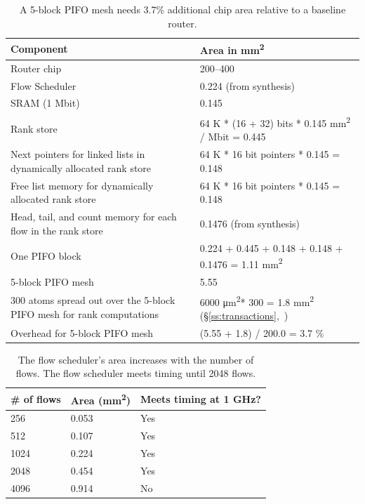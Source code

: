 \begin{table}[!h]
  \centering
  \begin{small}
  \begin{tabular}{|p{}|p{}|}
  \hline
  Component & Area in \si{\milli\metre\squared}\\
  \hline
  Router chip & 200--400~\cite{glen_parsing} \\
  \hline
  Flow Scheduler & 0.224 (from synthesis) \\
  \hline
  SRAM (1 Mbit) & 0.145~\cite{sram_estimate} \\
  \hline
  Rank store & 64 K * (16 + 32) bits * 0.145 \si{\milli\metre\squared} / Mbit = 0.445 \\
  \hline
  Next pointers for linked lists in dynamically allocated rank store & 64 K * 16 bit pointers * 0.145 = 0.148 \\
  \hline
  Free list memory for dynamically allocated rank store & 64 K * 16 bit pointers * 0.145 = 0.148 \\
  \hline
  Head, tail, and count memory for each flow in the rank store & 0.1476 (from synthesis) \\
  \hline
  One PIFO block & 0.224 + 0.445 + 0.148 + 0.148 + 0.1476 = 1.11 \si{\milli\metre\squared} \\
  \hline
  5-block PIFO mesh & 5.55 \\
  \hline
  300 atoms spread out over the 5-block PIFO mesh for rank computations & 6000 \si{\micro\metre\squared}* 300 = 1.8 \si{\milli\metre\squared} (\S\ref{ss:transactions},~\cite{domino_sigcomm})\\
  \hline
  Overhead for 5-block PIFO mesh & (5.55 + 1.8) / 200.0 = 3.7 \% \\
  \hline
  \end{tabular}
\end{small}
\caption{A 5-block PIFO mesh needs 3.7\% additional chip area relative to
a baseline router.}
\label{tab:area_overheads}
\end{table}

\begin{table}
\centering
\begin{small}
\begin{tabular}{|p{}|p{}|p{}|}
\hline
\# of flows & Area (mm\textsuperscript{2}) & Meets timing at 1 GHz? \\
\hline
256 & 0.053 & Yes \\
\hline
512 & 0.107 & Yes \\
\hline
1024 & 0.224 & Yes \\
\hline
2048 & 0.454 & Yes \\
\hline
4096 & 0.914 & No \\
\hline
\end{tabular}
\end{small}
\caption{The flow scheduler's area increases with the number of
flows. The flow scheduler meets timing until 2048 flows.}
\label{tab:num_flows}
\end{table}


